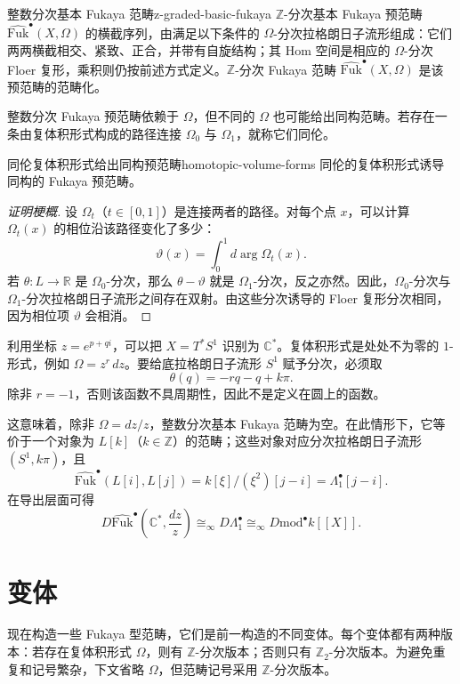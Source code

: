 \begin{definition}{整数分次基本 Fukaya 范畴}{z-graded-basic-fukaya}
$\mathbb Z$-分次基本 Fukaya 预范畴 $\widehat{\mathrm{Fuk}}^\bullet(X,\Omega)$ 的横截序列，由满足以下条件的 $\Omega$-分次拉格朗日子流形组成：它们两两横截相交、紧致、正合，并带有自旋结构；其 Hom 空间是相应的 $\Omega$-分次 Floer 复形，乘积则仍按前述方式定义。$\mathbb Z$-分次 Fukaya 范畴 $\widehat{\mathrm{Fuk}}^\bullet(X,\Omega)$ 是该预范畴的范畴化。
\end{definition}

整数分次 Fukaya 预范畴依赖于 $\Omega$，但不同的 $\Omega$ 也可能给出同构范畴。若存在一条由复体积形式构成的路径连接 $\Omega_0$ 与 $\Omega_1$，就称它们同伦。

\begin{lemma}{同伦复体积形式给出同构预范畴}{homotopic-volume-forms}
同伦的复体积形式诱导同构的 Fukaya 预范畴。
\end{lemma}
\begin{proof}[证明梗概]
设 $\Omega_t$（$t\in[0,1]$）是连接两者的路径。对每个点 $x$，可以计算 $\Omega_t(x)$ 的相位沿该路径变化了多少：
\[
  \vartheta(x)=\int_0^1d\arg\Omega_t(x).
\]
若 $\theta\colon L\to\mathbb R$ 是 $\Omega_0$-分次，那么 $\theta-\vartheta$ 就是 $\Omega_1$-分次，反之亦然。因此，$\Omega_0$-分次与 $\Omega_1$-分次拉格朗日子流形之间存在双射。由这些分次诱导的 Floer 复形分次相同，因为相位项 $\vartheta$ 会相消。
\end{proof}

\begin{example}[圆柱上的整数分次]
利用坐标 $z=e^{p+qi}$，可以把 $X=T^*S^1$ 识别为 $\mathbb C^*$。复体积形式是处处不为零的 $1$-形式，例如 $\Omega=z^r\,dz$。要给底拉格朗日子流形 $S^1$ 赋予分次，必须取
\[
  \theta(q)=-rq-q+k\pi.
\]
除非 $r=-1$，否则该函数不具周期性，因此不是定义在圆上的函数。

这意味着，除非 $\Omega=dz/z$，整数分次基本 Fukaya 范畴为空。在此情形下，它等价于一个对象为 $L[k]$（$k\in\mathbb Z$）的范畴；这些对象对应分次拉格朗日子流形 $(S^1,k\pi)$，且
\[
  \widehat{\mathrm{Fuk}}^\bullet(L[i],L[j])
  =k[\xi]/(\xi^2)[j-i]=\Lambda_1^\bullet[j-i].
\]
在导出层面可得
\[
  D\widehat{\mathrm{Fuk}}^\bullet\left(\mathbb C^*,\frac{dz}{z}\right)
  \cong_\infty D\Lambda_1^\bullet\cong_\infty D\mathrm{mod}^\bullet k[[X]].
\]
\end{example}

\section{变体}\label{sec:fukaya-variations}
现在构造一些 Fukaya 型范畴，它们是前一构造的不同变体。每个变体都有两种版本：若存在复体积形式 $\Omega$，则有 $\mathbb Z$-分次版本；否则只有 $\mathbb Z_2$-分次版本。为避免重复和记号繁杂，下文省略 $\Omega$，但范畴记号采用 $\mathbb Z$-分次版本。

